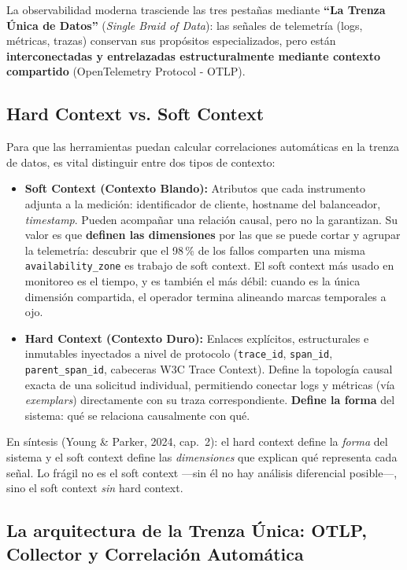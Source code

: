 \documentclass[variant=apuntes,cover=institutional,mode=screen]{ua-engineering-v6-article}
\begin{document}
La observabilidad moderna trasciende las tres pestañas mediante \textbf{``La Trenza Única de Datos''} (\emph{Single Braid of Data}): las señales de telemetría (logs, métricas, trazas) conservan sus propósitos especializados, pero están \textbf{interconectadas y entrelazadas estructuralmente mediante contexto compartido} (OpenTelemetry Protocol - OTLP).

\subsection{Hard Context vs. Soft Context}

Para que las herramientas puedan calcular correlaciones automáticas en la trenza de datos, es vital distinguir entre dos tipos de contexto:

\begin{itemize}
\item \textbf{Soft Context (Contexto Blando):} Atributos que cada instrumento adjunta a la medición: identificador de cliente, hostname del balanceador, \emph{timestamp}. Pueden acompañar una relación causal, pero no la garantizan. Su valor es que \textbf{definen las dimensiones} por las que se puede cortar y agrupar la telemetría: descubrir que el 98\,\% de los fallos comparten una misma \texttt{availability\_zone} es trabajo de soft context. El soft context más usado en monitoreo es el tiempo, y es también el más débil: cuando es la única dimensión compartida, el operador termina alineando marcas temporales a ojo.
\item \textbf{Hard Context (Contexto Duro):} Enlaces explícitos, estructurales e inmutables inyectados a nivel de protocolo (\texttt{trace\_id}, \texttt{span\_id}, \texttt{parent\_span\_id}, cabeceras W3C Trace Context). Define la topología causal exacta de una solicitud individual, permitiendo conectar logs y métricas (vía \emph{exemplars}) directamente con su traza correspondiente. \textbf{Define la forma} del sistema: qué se relaciona causalmente con qué.
\end{itemize}

En síntesis (Young \& Parker, 2024, cap.~2): el hard context define la \emph{forma} del sistema y el soft context define las \emph{dimensiones} que explican qué representa cada señal. Lo frágil no es el soft context ---sin él no hay análisis diferencial posible---, sino el soft context \emph{sin} hard context.

\subsection{La arquitectura de la Trenza Única: OTLP, Collector y Correlación Automática}
\end{document}
